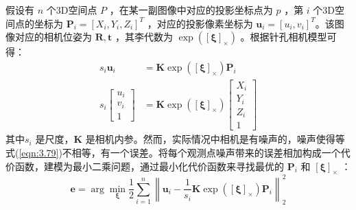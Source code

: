  假设有 $n$ 个3D空间点 $P$ ，在某一副图像中对应的投影坐标点为 $p$ ，第 $i$ 个3D空间点的坐标为 $\bm{P}_{i}=\left[X_{i}, Y_{i}, Z_{i}\right]^{T} $ ，对应的投影像素坐标为 $\boldsymbol{u}_{i}=\left[u_{i}, v_{i}\right]^{T} $。该图像对应的相机位姿为 $\bm{R}, \bm{t} $ ，其李代数为 $ \exp \left( \left[ \boldsymbol{\xi} \right]_\times \right) $ 。根据针孔相机模型可得：
\begin{equation}
\label{eqn:3.79}
\begin{aligned}
s_{i} \boldsymbol{u}_{i} &= \boldsymbol{K} \exp \left(  \left[\boldsymbol{\xi}\right]_\times  \right) \boldsymbol{P}_{i} \\
s_{i} \left[ \begin{array}{c}{u_{i}} \\ {v_{i}} \\ {1}\end{array}\right] &= \boldsymbol{K} \exp \left(  \left[\boldsymbol{\xi}\right]_\times \right) \left[ \begin{array}{c}{X_{i}} \\ {Y_{i}} \\ {Z_{i}} \\ {1}\end{array}\right]
\end{aligned}
\end{equation}
其中$s_i $ 是尺度，$\bm{K} $ 是相机内参。然而，实际情况中相机是有噪声的，噪声使得等式(\ref{eqn:3.79})不相等，有一个误差。将每个观测点噪声带来的误差相加构成一个代价函数，建模为最小二乘问题，通过最小化代价函数来寻找最优的 $\bm{P}_i$ 和 $ \left[\boldsymbol{\xi}\right]_\times  $ ：
\begin{equation}
\label{eqn:3.80}
\boldsymbol{e} =\arg \min _{\boldsymbol{\xi}} \frac{1}{2} \sum_{i=1}^{n}\left\|\boldsymbol{u}_{i}-\frac{1}{s_{i}} \boldsymbol{K} \exp \left(  \left[\boldsymbol{\xi}\right]_\times  \right) \boldsymbol{P}_{i}\right\|_{2}^{2}
\end{equation}

